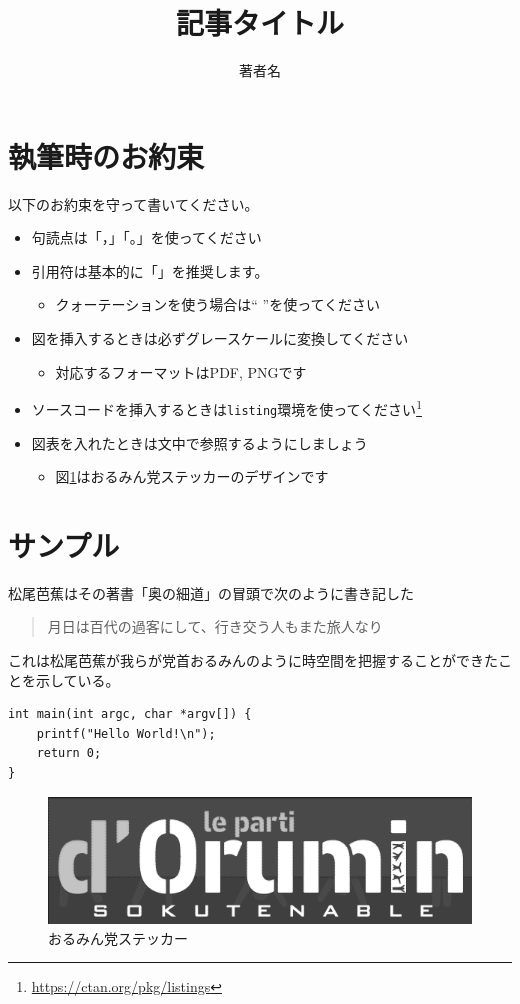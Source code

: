 \documentclass{sokuten}
\title{記事タイトル}
\author{著者名}
\date{}
\begin{document}
\maketitle

\section{執筆時のお約束}
以下のお約束を守って書いてください。
\begin{itemize}
	\item 句読点は「，」「。」を使ってください
	\item 引用符は基本的に「」を推奨します。
	\begin{itemize}
		\item クォーテーションを使う場合は`` ''を使ってください
	\end{itemize}
	\item 図を挿入するときは必ずグレースケールに変換してください
	\begin{itemize}
		\item 対応するフォーマットはPDF, PNGです
	\end{itemize}
	\item ソースコードを挿入するときは\verb|listing|環境を使ってください\footnote{\url{https://ctan.org/pkg/listings}}
	\item 図表を入れたときは文中で参照するようにしましょう
	\begin{itemize}
		\item 図\ref{img:sample}はおるみん党ステッカーのデザインです
	\end{itemize}
\end{itemize}
\section{サンプル}
松尾芭蕉はその著書「奥の細道」の冒頭で次のように書き記した

\begin{quote}
月日は百代の過客にして、行き交う人もまた旅人なり
\end{quote}

これは松尾芭蕉が我らが党首おるみんのように時空間を把握することができたことを示している。

\begin{lstlisting}
int main(int argc, char *argv[]) {
	printf("Hello World!\n");
	return 0;
}
\end{lstlisting}

\begin{figure}[tb]
	\centering
	\includegraphics[width=0.8\linewidth]{images/oruminparty_sticker.png}
	\caption{おるみん党ステッカー}
	\label{img:sample}
\end{figure}
\end{document}
